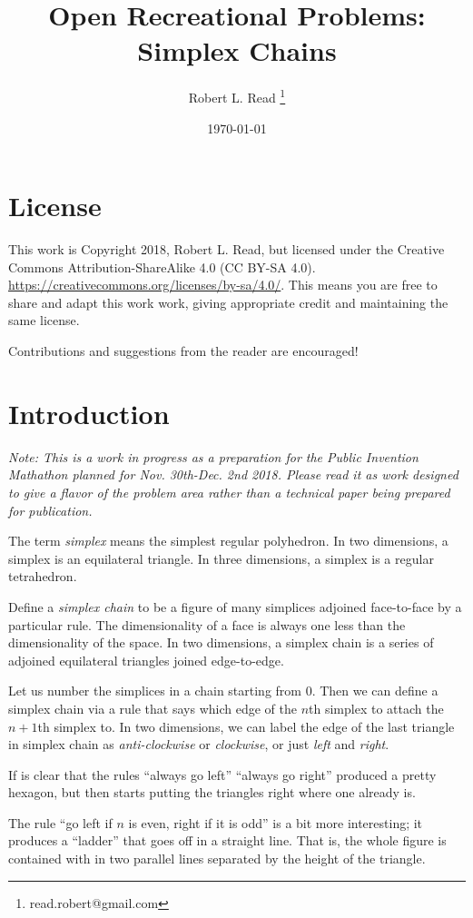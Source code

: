 \documentclass[11pt]{article}
\title{Open Recreational Problems: Simplex Chains}
\author{Robert L. Read
  \thanks{read.robert@gmail.com}
}
\affil{Founder, Public Invention, an educational non-profit.}
\date{\today}
\begin{document}
\maketitle


\section{License}
This work is Copyright 2018, Robert L. Read, but licensed under the Creative Commons Attribution-ShareAlike 4.0 (CC BY-SA 4.0).
\url{https://creativecommons.org/licenses/by-sa/4.0/}. This means you are free to share and adapt this work work, giving appropriate credit
and maintaining the same license.

Contributions and suggestions from the reader are encouraged!

\section{Introduction}

{\em
Note: This is a work in progress as a preparation for the Public Invention Mathathon planned for Nov. 30th-Dec. 2nd 2018.
Please read it as work designed to give a flavor of the problem area rather than a technical paper being prepared for publication.
}

The term {\em simplex} means the simplest regular polyhedron. In two dimensions, a simplex is an equilateral triangle.
In three dimensions, a simplex is a regular tetrahedron.

Define a {\em simplex chain} to be a figure of many simplices adjoined face-to-face by a particular rule.
The dimensionality of a face is always one less than the dimensionality of the space. In two dimensions,
a simplex chain is a series of adjoined equilateral triangles joined edge-to-edge.

Let us number the simplices in a chain starting from $0$. Then we can define a simplex chain via a rule
that says which edge of the $n$th simplex to attach the $n+1$th simplex to. In two dimensions, we can
label the edge of the last triangle in simplex chain as {\em anti-clockwise} or {\em clockwise}, or just
{\em left} and {\em right}.

If is clear that the rules ``always go left'' ``always go right'' produced a pretty hexagon, but then starts putting the triangles
right where one already is.

The rule ``go left if $n$ is even, right if it is odd'' is a bit more interesting; it produces a ``ladder'' that goes off
in a straight line. That is, the whole figure is contained with in two parallel lines separated by the height of the triangle.
\end{document}
